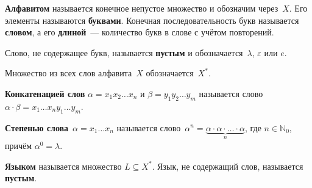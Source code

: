  \textbf{Алфавитом} называется конечное непустое множество и обозначим через~$X$.
 Его элементы называются \textbf{буквами}.
 Конечная последовательность букв называется \textbf{словом}, а его \textbf{длиной}~--- количество букв в слове с учётом повторений.

Слово, не содержащее букв, называется \textbf{пустым} и обозначается~$\lambda$, $\varepsilon$ или $e$.

Множество из всех слов алфавита~$X$ обозначается~$X^*$.

 \textbf{Конкатенацией слов} $\alpha = x_1 x_2 \ldots x_n$ и $\beta = y_1 y_2 \ldots y_m$ называется слово $\alpha \cdot \beta = x_1 \ldots x_n y_1 \ldots y_m$.

 \textbf{Степенью слова}~$\alpha = x_1 \ldots x_n$ называется слово~$\alpha^n = \underbrace{\alpha \cdot \alpha \cdot \ldots \cdot \alpha}_n$, где $n \in \mathbb N_0$, причём $\alpha^0 = \lambda$.

 \textbf{Языком} называется множество $L \subseteq X^*$.
Язык, не содержащий слов, называется \textbf{пустым}.